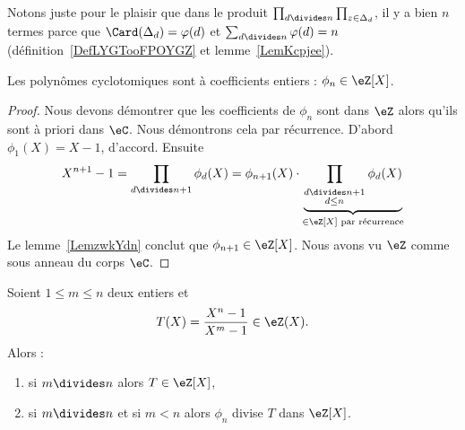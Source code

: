 \begin{remark}
    Notons juste pour le plaisir que dans le produit \( \prod_{d\divides n}\prod_{z\in\Delta_d}\), il y a bien \( n\) termes parce que \( \Card(\Delta_d)=\varphi(d)\) et \( \sum_{d\divides n}\varphi(d)=n\) (définition~\ref{DefLYGTooFPOYGZ} et lemme~\ref{LemKcpjee}).
\end{remark}

\begin{proposition}
    Les polynômes cyclotomiques sont à coefficients entiers : \( \phi_n\in \eZ[X]\).
\end{proposition}

\begin{proof}
            Nous devons démontrer que les coefficients de \( \phi_n\) sont dans \( \eZ\) alors qu'ils sont à priori dans \( \eC\). Nous démontrons cela par récurrence. D'abord \( \phi_1(X)=X-1\), d'accord. Ensuite
            \begin{equation}
                X^{n+1}-1=\prod_{d\divides n+1}\phi_d(X)=\phi_{n+1}(X)\cdot\underbrace{\prod_{_{\substack{d\divides n+1\\d\leq n}}}\phi_d(X)}_{\in\eZ[X]\text{ par récurrence}}
            \end{equation}
            Le lemme~\ref{LemzwkYdn} conclut que \( \phi_{n+1}\in \eZ[X]\). Nous avons vu \( \eZ\) comme sous anneau du corps \( \eC\).
\end{proof}

\begin{proposition}     \label{PropUImYnL}
    Soient \( 1\leq m\leq n\) deux entiers et
    \begin{equation}
        T(X)=\frac{ X^n-1 }{ X^m-1 }\in \eZ(X).
    \end{equation}
    Alors :
    \begin{enumerate}
        \item   \label{ItemhpDPKE}
            si \( m\divides n\) alors \( T\in \eZ[X]\),
        \item
            si \( m\divides n\) et si \( m<n\) alors \( \phi_n\) divise \( T\) dans \( \eZ[X]\).
    \end{enumerate}
\end{proposition}

